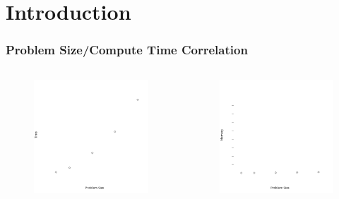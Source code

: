 

\section{Introduction}

\begin{frame}
	\frametitle{Problem Size/Compute Time Correlation}
		\begin{columns}[c] 

			\begin{figure}
					\includegraphics[width=0.85\linewidth]{figures/time/laplace}
			\end{figure}

			\begin{figure}
			\includegraphics[width=0.85\linewidth]{figures/memory/laplace}
			\end{figure}
		\end{columns}
\end{frame}

